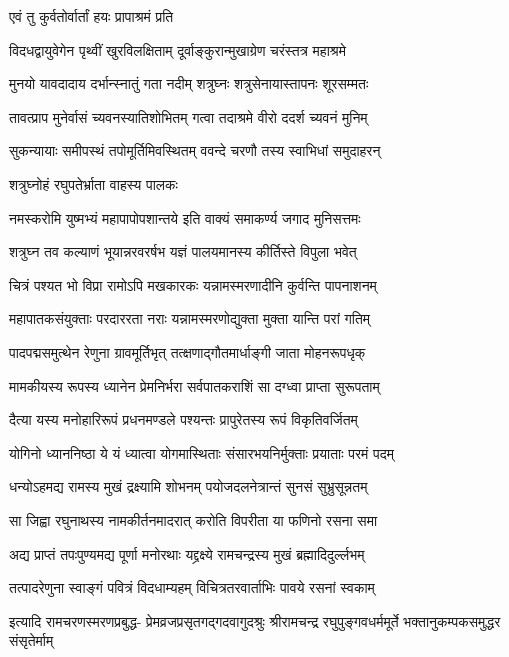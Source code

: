 
\onelineshloka
{एवं तु कुर्वतोर्वार्तां हयः प्रापाश्रमं प्रति}%

\twolineshloka
{विदधद्वायुवेगेन पृथ्वीं खुरविलक्षिताम्}
{दूर्वाङ्कुरान्मुखाग्रेण चरंस्तत्र महाश्रमे}%

\twolineshloka
{मुनयो यावदादाय दर्भान्स्नातुं गता नदीम्}
{शत्रुघ्नः शत्रुसेनायास्तापनः शूरसम्मतः}%

\twolineshloka
{तावत्प्राप मुनेर्वासं च्यवनस्यातिशोभितम्}
{गत्वा तदाश्रमे वीरो ददर्श च्यवनं मुनिम्}%

\twolineshloka
{सुकन्यायाः समीपस्थं तपोमूर्तिमिवस्थितम्}
{ववन्दे चरणौ तस्य स्वाभिधां समुदाहरन्}%

\onelineshloka
{शत्रुघ्नोहं रघुपतेर्भ्राता वाहस्य पालकः}%

\twolineshloka
{नमस्करोमि युष्मभ्यं महापापोपशान्तये}
{इति वाक्यं समाकर्ण्य जगाद मुनिसत्तमः}%

\twolineshloka
{शत्रुघ्न तव कल्याणं भूयान्नरवरर्षभ}
{यज्ञं पालयमानस्य कीर्तिस्ते विपुला भवेत्}%

\twolineshloka
{चित्रं पश्यत भो विप्रा रामोऽपि मखकारकः}
{यन्नामस्मरणादीनि कुर्वन्ति पापनाशनम्}%

\twolineshloka
{महापातकसंयुक्ताः परदाररता नराः}
{यन्नामस्मरणोद्युक्ता मुक्ता यान्ति परां गतिम्}%

\twolineshloka
{पादपद्मसमुत्थेन रेणुना ग्रावमूर्तिभृत्}
{तत्क्षणाद्गौतमार्धाङ्गी जाता मोहनरूपधृक्}%

\twolineshloka
{मामकीयस्य रूपस्य ध्यानेन प्रेमनिर्भरा}
{सर्वपातकराशिं सा दग्ध्वा प्राप्ता सुरूपताम्}%

\twolineshloka
{दैत्या यस्य मनोहारिरूपं प्रधनमण्डले}
{पश्यन्तः प्रापुरेतस्य रूपं विकृतिवर्जितम्}%

\twolineshloka
{योगिनो ध्याननिष्ठा ये यं ध्यात्वा योगमास्थिताः}
{संसारभयनिर्मुक्ताः प्रयाताः परमं पदम्}%

\twolineshloka
{धन्योऽहमद्य रामस्य मुखं द्रक्ष्यामि शोभनम्}
{पयोजदलनेत्रान्तं सुनसं सुभ्रुसून्नतम्}%

\twolineshloka
{सा जिह्वा रघुनाथस्य नामकीर्तनमादरात्}
{करोति विपरीता या फणिनो रसना समा}%

\twolineshloka
{अद्य प्राप्तं तपःपुण्यमद्य पूर्णा मनोरथाः}
{यद्द्रक्ष्ये रामचन्द्रस्य मुखं ब्रह्मादिदुर्ल्लभम्}%

\twolineshloka
{तत्पादरेणुना स्वाङ्गं पवित्रं विदधाम्यहम्}
{विचित्रतरवार्ताभिः पावये रसनां स्वकाम्}%

\fourlineindentedshloka
{इत्यादि रामचरणस्मरणप्रबुद्ध-}
{प्रेमव्रजप्रसृतगद्गदवागुदश्रुः}
{श्रीरामचन्द्र रघुपुङ्गवधर्ममूर्ते}
{भक्तानुकम्पकसमुद्धर संसृतेर्माम्}%

